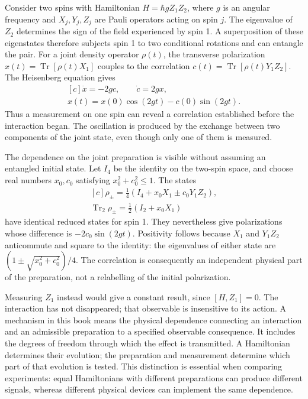 \documentclass[11pt,oneside]{book}
\newenvironment{centeredalign}{\[\begin{gathered}[c]}{\end{gathered}\]}
\begin{document}
Consider two spins with Hamiltonian \(H=\hbar g Z_1Z_2\), where \(g\) is an
angular frequency and \(X_j,Y_j,Z_j\) are Pauli operators acting on spin \(j\).
The eigenvalue of \(Z_2\) determines the sign of the field experienced by spin
1. A superposition of these eigenstates therefore subjects spin 1 to two
conditional rotations and can entangle the pair. For a joint density operator
\(\rho(t)\), the transverse polarization \(x(t)=\operatorname{Tr}[\rho(t)X_1]\)
couples to the correlation \(c(t)=\operatorname{Tr}[\rho(t)Y_1Z_2]\).
The Heisenberg equation gives
\begin{centeredalign}
\dot x=-2gc,\qquad \dot c=2gx,\\
x(t)=x(0)\cos(2gt)-c(0)\sin(2gt).
\end{centeredalign}
Thus a measurement on one spin can reveal a correlation established before
the interaction began. The oscillation is produced by the exchange between
two components of the joint state, even though only one of them is measured.

The dependence on the joint preparation is visible without assuming an
entangled initial state. Let \(I_4\) be the identity on the two-spin space,
and choose real numbers \(x_0,c_0\) satisfying \(x_0^2+c_0^2\leq1\). The states
\begin{centeredalign}
\rho_\pm=\tfrac14(I_4+x_0X_1\pm c_0Y_1Z_2),\\
\operatorname{Tr}_2\rho_\pm=\tfrac12(I_2+x_0X_1)
\end{centeredalign}
have identical reduced states for spin 1. They nevertheless give polarizations
whose difference is \(-2c_0\sin(2gt)\). Positivity follows because \(X_1\) and
\(Y_1Z_2\) anticommute and square to the identity: the eigenvalues of either
state are \((1\pm\sqrt{x_0^2+c_0^2})/4\). The correlation is consequently an
independent physical part of the preparation, not a relabelling of the initial
polarization.

Measuring \(Z_1\) instead would give a constant result, since
\([H,Z_1]=0\). The interaction has not disappeared; that observable is
insensitive to its action. A mechanism in this book means the physical
dependence connecting an interaction and an admissible preparation to a
specified observable consequence. It includes the degrees of freedom through
which the effect is transmitted. A Hamiltonian determines their evolution;
the preparation and measurement determine which part of that evolution is
tested. This distinction is essential when comparing experiments: equal
Hamiltonians with different preparations can produce different signals,
whereas different physical devices can implement the same dependence.
\end{document}
